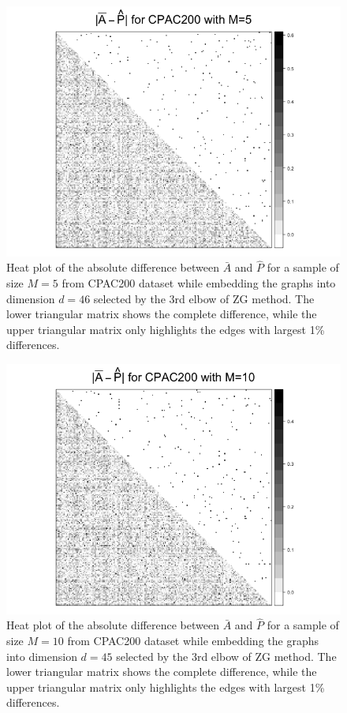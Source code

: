 \documentclass[a4paper]{article}
\begin{document}
\begin{figure}[!htb]
\centering
\includegraphics[width=1\textwidth]{Diff_CPAC200_m5.png}
\caption{Heat plot of the absolute difference between $\bar{A}$ and $\hat{P}$ for a sample of size $M=5$ from CPAC200 dataset while embedding the graphs into dimension $d=46$ selected by the 3rd elbow of ZG method. The lower triangular matrix shows the complete difference, while the upper triangular matrix only highlights the edges with largest 1\% differences.}
\label{fig:Diff_CPAC200_m5}
\end{figure}

\begin{figure}[!htb]
\centering
\includegraphics[width=1\textwidth]{Diff_CPAC200_m10.png}
\caption{Heat plot of the absolute difference between $\bar{A}$ and $\hat{P}$ for a sample of size $M=10$ from CPAC200 dataset while embedding the graphs into dimension $d=45$ selected by the 3rd elbow of ZG method. The lower triangular matrix shows the complete difference, while the upper triangular matrix only highlights the edges with largest 1\% differences.}
\label{fig:Diff_CPAC200_m10}
\end{figure}
\end{document}
